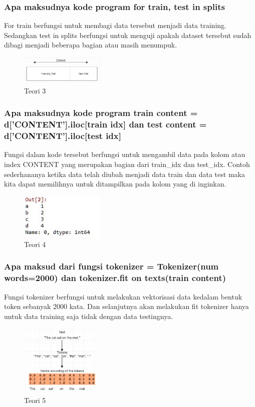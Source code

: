 \subsubsection{Apa maksudnya kode program for train, test in splits}
\hfill\break
For train berfungsi untuk membagi data tersebut menjadi data training. Sedangkan test in splits berfungsi untuk menguji apakah dataset tersebut sudah dibagi menjadi beberapa bagian atau masih menumpuk.
\begin{figure}[H]
\centering
	\includegraphics[width=4cm]{figures/1174066/7/3.jpg}
\caption{Teori 3}
\end{figure}

\subsubsection{Apa maksudnya kode program train content = d[’CONTENT’].iloc[train idx] dan test content = d[’CONTENT’].iloc[test idx]}
\hfill\break
Fungsi dalam kode tersebut berfungsi untuk mengambil data pada kolom atau index CONTENT yang merupakan bagian dari train\_idx dan test\_idx. Contoh sederhananya ketika data telah diubah menjadi data train dan data test maka kita dapat memilihnya untuk ditampilkan pada kolom yang di inginkan. 

\begin{figure}[H]
\centering
	\includegraphics[width=4cm]{figures/1174066/7/4.jpg}
\caption{Teori 4}
\end{figure}

\subsubsection{Apa maksud dari fungsi tokenizer = Tokenizer(num words=2000) dan tokenizer.fit on texts(train content)}
\hfill\break
Fungsi tokenizer berfungsi untuk melakukan vektorisasi data kedalam bentuk token sebanyak 2000 kata. Dan selanjutnya akan melakukan fit tokenizer hanya untuk data training saja tidak dengan data testingnya.
\begin{figure}[H]
\centering
	\includegraphics[width=4cm]{figures/1174066/7/5.jpg}
\caption{Teori 5}
\end{figure}

